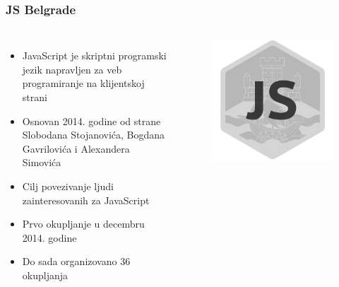 \documentclass[hyperref={bookmarks=false},aspectratio=169]{beamer}
\begin{document}
\begin{frame}
\frametitle{JS Belgrade}

\begin{columns}[T]

\begin{itemize}
    \item JavaScript je skriptni programski jezik napravljen za veb programiranje na klijentskoj strani
    \item Osnovan 2014. godine od strane Slobodana Stojanovića, Bogdana Gavrilovića i Alexandera Simovića
    \item Cilj povezivanje ljudi zainteresovanih za JavaScript
    \item Prvo okupljanje u decembru 2014. godine
    \item Do sada organizovano 36 okupljanja
\end{itemize}


\begin{figure}
    \raggedleft
    \includegraphics[scale=0.2]{./images/JS_logo.png}
\end{figure}
\end{columns}
\end{frame}
\end{document}
